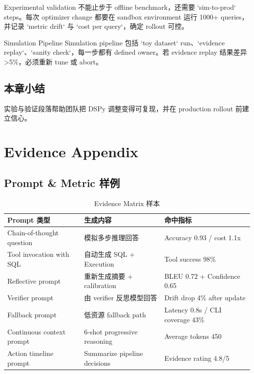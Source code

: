 \documentclass[a4paper]{article}
\begin{document}
Experimental validation 不能止步于 offline benchmark，还需要 `sim-to-prod` steps。每次 optimizer change 都要在 sandbox environment 运行 1000+ queries，并记录 `metric drift` 与 `cost per query`，确定 rollout 可控。

\begin{knowledgebox}{Simulation Pipeline}
Simulation pipeline 包括 `toy dataset` run、`evidence replay`、`sanity check`，每一步都有 defined owner。若 evidence replay 结果差异 >5\%，必须重新 tune 或 abort。
\end{knowledgebox}

\subsection{本章小结}

实验与验证段落帮助团队把 DSPy 调整变得可复现，并在 production rollout 前建立信心。

\section{Evidence Appendix}

\subsection{Prompt \& Metric 样例}

\begin{table}[H]
\centering
\caption{Evidence Matrix 样本}
\begin{tabular}{p{}p{}p{}}
\toprule
Prompt 类型 & 生成内容 & 命中指标 \\
\midrule
Chain-of-thought question & 模拟多步推理回答 & Accuracy 0.93 / cost 1.1x \\
Tool invocation with SQL & 自动生成 SQL + Execution & Tool success 98\% \\
Reflective prompt & 重新生成摘要 + calibration & BLEU 0.72 + Confidence 0.65 \\
Verifier prompt & 由 verifier 反思模型回答 & Drift drop 4\% after update \\
Fallback prompt & 低资源 fallback path & Latency 0.8s / CLI coverage 43\% \\
Continuous context prompt & 6-shot progressive reasoning & Average tokens 450 \\
Action timeline prompt & Summarize pipeline decisions & Evidence rating 4.8/5 \\
\bottomrule
\end{tabular}
\end{table}
\end{document}
